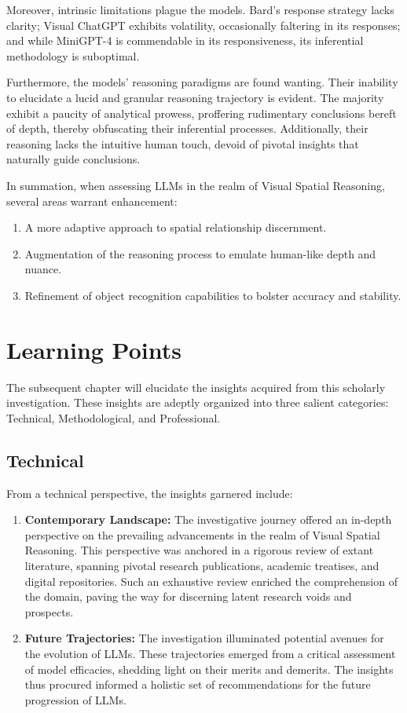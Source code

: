 \documentclass[twocolumn,11pt]{report}
\begin{document}
Moreover, intrinsic limitations plague the models. Bard's response strategy lacks clarity; Visual ChatGPT exhibits volatility, occasionally faltering in its responses; and while MiniGPT-4 is commendable in its responsiveness, its inferential methodology is suboptimal.

Furthermore, the models' reasoning paradigms are found wanting. Their inability to elucidate a lucid and granular reasoning trajectory is evident. The majority exhibit a paucity of analytical prowess, proffering rudimentary conclusions bereft of depth, thereby obfuscating their inferential processes. Additionally, their reasoning lacks the intuitive human touch, devoid of pivotal insights that naturally guide conclusions.

In summation, when assessing LLMs in the realm of Visual Spatial Reasoning, several areas warrant enhancement:
\begin{enumerate}
    \item A more adaptive approach to spatial relationship discernment.
    \item Augmentation of the reasoning process to emulate human-like depth and nuance.
    \item Refinement of object recognition capabilities to bolster accuracy and stability.
\end{enumerate}

\chapter{Learning Points}\label{chap:learning}
The subsequent chapter will elucidate the insights acquired from this scholarly investigation. These insights are adeptly organized into three salient categories: Technical, Methodological, and Professional.

\section{Technical}
From a technical perspective, the insights garnered include:
\begin{enumerate}
\item \textbf{Contemporary Landscape:} The investigative journey offered an in-depth perspective on the prevailing advancements in the realm of Visual Spatial Reasoning. This perspective was anchored in a rigorous review of extant literature, spanning pivotal research publications, academic treatises, and digital repositories. Such an exhaustive review enriched the comprehension of the domain, paving the way for discerning latent research voids and prospects.
\item \textbf{Future Trajectories:} The investigation illuminated potential avenues for the evolution of LLMs. These trajectories emerged from a critical assessment of model efficacies, shedding light on their merits and demerits. The insights thus procured informed a holistic set of recommendations for the future progression of LLMs.
\end{enumerate}
\end{document}
